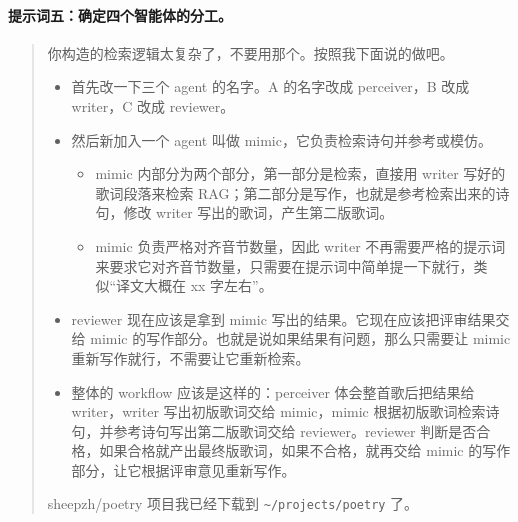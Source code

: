 \documentclass[12pt, a4paper]{ctexart}
\numberwithin{table}{section}
\numberwithin{figure}{section}
\begin{document}
\paragraph{提示词五：确定四个智能体的分工。}
\begin{quote}\small
你构造的检索逻辑太复杂了，不要用那个。按照我下面说的做吧。

\begin{itemize}[leftmargin=1.8em,itemsep=2pt,topsep=3pt,parsep=0pt]
  \item 首先改一下三个 agent 的名字。A 的名字改成 perceiver，B 改成 writer，C 改成 reviewer。
  \item 然后新加入一个 agent 叫做 mimic，它负责检索诗句并参考或模仿。
  \begin{itemize}[leftmargin=1.8em,itemsep=2pt,topsep=3pt,parsep=0pt]
    \item mimic 内部分为两个部分，第一部分是检索，直接用 writer 写好的歌词段落来检索 RAG；第二部分是写作，也就是参考检索出来的诗句，修改 writer 写出的歌词，产生第二版歌词。
    \item mimic 负责严格对齐音节数量，因此 writer 不再需要严格的提示词来要求它对齐音节数量，只需要在提示词中简单提一下就行，类似“译文大概在 xx 字左右”。
  \end{itemize}
  \item reviewer 现在应该是拿到 mimic 写出的结果。它现在应该把评审结果交给 mimic 的写作部分。也就是说如果结果有问题，那么只需要让 mimic 重新写作就行，不需要让它重新检索。
  \item 整体的 workflow 应该是这样的：perceiver 体会整首歌后把结果给 writer，writer 写出初版歌词交给 mimic，mimic 根据初版歌词检索诗句，并参考诗句写出第二版歌词交给 reviewer。reviewer 判断是否合格，如果合格就产出最终版歌词，如果不合格，就再交给 mimic 的写作部分，让它根据评审意见重新写作。
\end{itemize}

sheepzh/poetry 项目我已经下载到 \texttt{\textasciitilde/projects/poetry} 了。
\end{quote}
\end{document}
